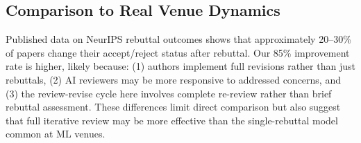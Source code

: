 \subsection{Comparison to Real Venue Dynamics}

Published data on NeurIPS rebuttal outcomes shows that approximately 20--30\% of papers change their accept/reject status after rebuttal. Our 85\% improvement rate is higher, likely because: (1) authors implement full revisions rather than just rebuttals, (2) AI reviewers may be more responsive to addressed concerns, and (3) the review-revise cycle here involves complete re-review rather than brief rebuttal assessment. These differences limit direct comparison but also suggest that full iterative review may be more effective than the single-rebuttal model common at ML venues.
